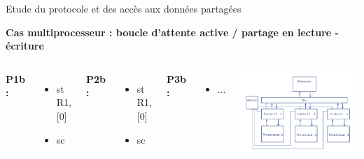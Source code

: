 \documentclass{beamer}
\begin{document}
\begin{frame}{Etude du protocole et des accès aux données partagées}
    \addtocounter{framenumber}{-1}
    \textbf{Cas multiprocesseur : boucle d’attente active / partage en lecture - \hspace*{3.8cm} écriture}
    \begin{columns}[c] %

        \textbf{P1b : }
        \begin{itemize}
            \item st R1, [0]
            \item sc
        \end{itemize}
        \textbf{P2b : }
        \begin{itemize}
            \item st R1, [0]
            \item sc
        \end{itemize}

        \textbf{P3b : }
        \begin{itemize}
            \item ...
        \end{itemize}

        \vspace{1cm}
        \includegraphics[scale=0.3]{archi.png}
        
    \end{columns}
\end{frame}
\end{document}
